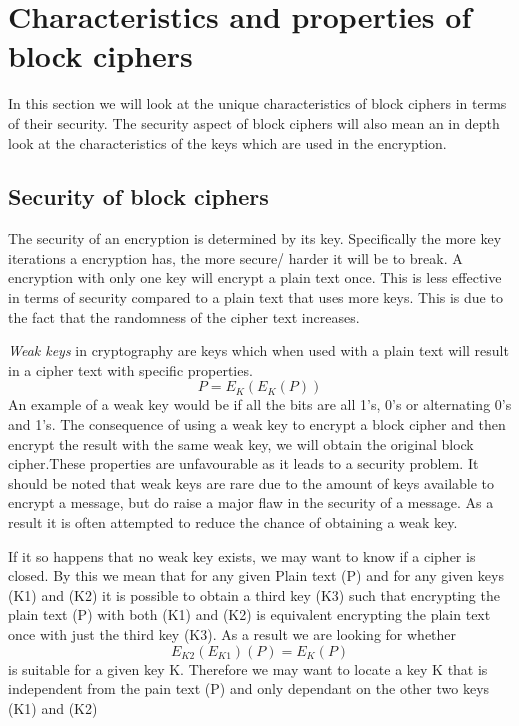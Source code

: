 \documentclass[11pt,a4paper]{report}
\begin{document}
\section{Characteristics and properties of block ciphers}
In this section we will look at the unique characteristics of block ciphers in terms of their security. The security aspect of block ciphers will also mean an in depth look at the characteristics of the keys which are used in the encryption. 

\subsection{Security of block ciphers}
The security of an encryption is determined by its key. Specifically the more key iterations a encryption has, the more secure/ harder it will be to break. A encryption with only one key will encrypt a plain text once. This is less effective in terms of security compared to a plain text that uses more keys. This is due to the fact that the randomness of the cipher text increases.

\emph{Weak keys} in cryptography are keys which when used with a plain text will result in a cipher text with specific properties. 
\begin{displaymath}
P = E_{K}(E_{K}(P))
\end{displaymath}
An example of a weak key would be if all the bits are all 1's, 0's or alternating 0's and 1's. The consequence of using a weak key to encrypt a block cipher and then encrypt the result with the same weak key, we will obtain the original block cipher.These properties are unfavourable as it leads to a security problem. It should be noted that weak keys are rare due to the amount of keys available to encrypt a message, but do raise a major flaw in the security of a message. As a result it is often attempted to reduce the chance of obtaining a weak key.

If it so happens that no weak key exists, we may want to know if a cipher is closed. By this we mean that for any given Plain text (P) and for any given keys (K1) and (K2) it is possible to obtain a third key (K3) such that encrypting the plain text (P) with both (K1) and (K2) is equivalent encrypting the plain text once with just the third key (K3). As a result we are looking for whether
\begin{displaymath}
E_{K2}(E_{K1})(P) = E_{K}(P)
\end{displaymath} 
is suitable for a given key K. Therefore we may want to locate a key K that is independent from the pain text (P) and only dependant on the other two keys (K1) and (K2) 
\end{document}
